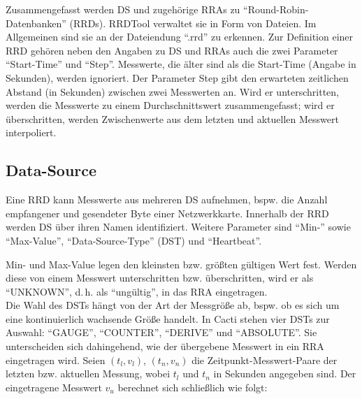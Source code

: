 \documentclass[12pt,ngerman,toc=listofnumbered,toc=bibliographynumbered,toc=index,headsepline=true]{scrbook}
\begin{document}
Zusammengefasst werden DS und zugehörige RRAs zu
\enquote{Round-Robin-Da\-ten\-bank\-en} (RRDs). RRDTool verwaltet sie in Form
von Dateien. Im Allgemeinen sind sie an der Dateiendung \enquote{.rrd} zu
erkennen. Zur Definition einer RRD gehören neben den Angaben zu DS und RRAs
auch die zwei Parameter \enquote{Start-Time} und \enquote{Step}. Messwerte, die
älter sind als die Start-Time (Angabe in Sekunden), werden ignoriert. Der
Parameter Step gibt den erwarteten zeitlichen Abstand (in Sekunden) zwischen
zwei Messwerten an. Wird er unterschritten, werden die Messwerte zu einem
Durchschnittswert zusammengefasst; wird er überschritten, werden Zwischenwerte
aus dem letzten und aktuellen Messwert interpoliert.

\subsection{Data-Source}
Eine RRD kann Messwerte aus mehreren DS aufnehmen, bspw. die Anzahl empfangener
und gesendeter Byte einer Netzwerkkarte. Innerhalb der RRD werden DS über ihren
Namen identifiziert. Weitere Parameter sind \enquote{Min-} sowie
\enquote{Max-Value}, \enquote{Data-Source-Type} (DST) und \enquote{Heartbeat}.

Min- und Max-Value legen den kleinsten bzw. größten gültigen Wert fest. Werden
diese von einem Messwert unterschritten bzw. überschritten, wird er als
\enquote{UNKNOWN}, d.\,h. als \enquote{ungültig}, in das RRA eingetragen.\\
Die Wahl des DSTs hängt von der Art der Messgröße ab, bspw. ob es sich um eine
kontinuierlich wachsende Größe handelt. In Cacti stehen vier DSTs zur Auswahl:
\enquote{GAUGE}, \enquote{COUNTER}, \enquote{DERIVE} und \enquote{ABSOLUTE}. Sie
unterscheiden sich dahingehend, wie der übergebene Messwert in ein RRA
eingetragen wird. Seien $(t_l, v_l)$, $(t_n, v_n)$ die Zeitpunkt-Messwert-Paare
der letzten bzw. aktuellen Messung, wobei $t_l$ und $t_n$ in Sekunden angegeben
sind. Der eingetragene Messwert $v_u$ berechnet sich schließlich wie folgt:
\end{document}
